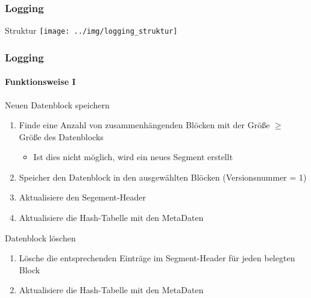 \documentclass{beamer}
\begin{document}
		\begin{frame}
			\frametitle{Logging}

			\begin{block}{Struktur}
				\center\texttt{[image: ../img/logging\_struktur]}
			\end{block}
		\end{frame}

		\begin{frame}
			\frametitle{Logging}
			\framesubtitle{Funktionsweise I}

			\begin{block}{Neuen Datenblock speichern}
				\begin{enumerate}
					\item Finde eine Anzahl von zusammenhängenden Blöcken mit der Größe $\geq$ Größe des Datenblocks
						\begin{itemize}
							\item Ist dies nicht möglich, wird ein neues Segment erstellt
						\end{itemize}
					\item Speicher den Datenblock in den ausgewählten Blöcken (Versionsnummer = 1)
					\item Aktualisiere den Segement-Header
					\item Aktualisiere die Hash-Tabelle mit den MetaDaten
				\end{enumerate}
			\end{block}

			\begin{block}{Datenblock löschen}
				\begin{enumerate}
					\item Lösche die entsprechenden Einträge im Segment-Header für jeden belegten Block
					\item Aktualisiere die Hash-Tabelle mit den MetaDaten
				\end{enumerate}
			\end{block}
		\end{frame}
\end{document}
